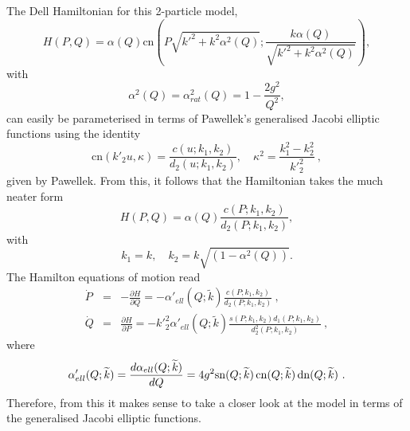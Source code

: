 \documentclass[fleqn,11pt,twoside]{article}
\newcommand{\bse}{\begin{subequations}}
\newcommand{\ese}{\end{subequations}}
\theoremstyle{definition}
\begin{document}
The Dell Hamiltonian for this 2-particle model,
\begin{equation}\label{eq:DELLHam} 
H(P,Q)=\alpha(Q)\mathrm{cn}\left(P\sqrt{k'^2+k^2\alpha^2(Q)};\frac{k\alpha(Q)}{\sqrt{k'^2+k^2\alpha^2(Q)}}\right),
\end{equation}
with
\begin{equation}
\alpha^2(Q)=\alpha^2_{rat}(Q)=1-\frac{2g^2}{Q^2},
\end{equation}
can easily be parameterised in terms of Pawellek's generalised Jacobi elliptic functions using the identity
\begin{equation}
\mathrm{cn}(k'_2u,\kappa)=\frac{c(u;k_1,k_2)}{d_2(u;k_1,k_2)},\quad \kappa^2=\frac{k_1^2-k_2^2}{{k'}_2^2}\  , 
\end{equation}
given by Pawellek. From this, it follows that the Hamiltonian takes the much neater form
\begin{equation}
H(P,Q)=\alpha(Q)\frac{c(P;k_1,k_2)}{d_2(P;k_1,k_2)},
\end{equation}
with
\begin{equation}
k_1=k, \quad 
k_2=k\sqrt{(1-\alpha^2(Q))}.
\end{equation}
The Hamilton equations of motion read
\bse\label{eq:Hameqs}
\begin{eqnarray} 
\dot{P} &=& -\frac{\partial H}{\partial Q}= -\alpha'_{ell}(Q;\widetilde{k}) \frac{c(P;k_1,k_2)}{d_2(P;k_1,k_2)}\ , \\ 
\dot{Q} &=& \frac{\partial H}{\partial P}= -{k'}_2^2\alpha'_{ell}(Q;\widetilde{k}) 
\frac{s(P;k_1,k_2)d_1(P;k_1,k_2)}{d_2^2(P;k_1,k_2)}\ , 
\end{eqnarray} 
\ese 
where 
\[ \alpha'_{ell}(Q;\widetilde{k})=\frac{d \alpha_{ell}(Q;\widetilde{k})}{dQ}=4g^2 {\rm sn}(Q;\widetilde{k})\, 
{\rm cn}(Q;\widetilde{k})\,{\rm dn}(Q;\widetilde{k})\ . 
\] 
Therefore, from this it makes sense to take a closer look at the model in terms of the generalised Jacobi elliptic functions. 
\end{document}
